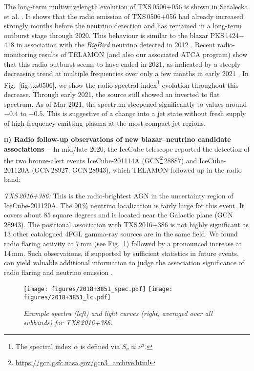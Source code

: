 \documentclass[a4paper,11pt]{article}
\begin{document}
The long-term multiwavelength evolution of TXS\,0506+056 is shown in Satalecka et al. \cite[][these proceedings]{satalecka2021}. It shows that the radio emission of TXS\,0506+056 had already increased strongly months before the neutrino detection and has remained in a long-term outburst stage through 2020. This behaviour is similar to the blazar PKS\,1424$-$418 in association with the \textsl{BigBird} neutrino detected in 2012 \cite{Kadler2016}.
Recent radio-monitoring results of TELAMON (and also our associated ATCA program) show that this radio outburst seems to have ended in 2021, as indicated by a steeply decreasing trend at multiple frequencies over only a few months in early 2021 \cite[see][for the radio and multiwavelength light curves]{satalecka2021}.
In Fig.~\ref{fig:txs0506}, we show the radio spectral-index\footnote{The spectral index $\alpha$ is defined via $S_\nu \propto \nu^\alpha$.} evolution throughout this decrease. Through early 2021, the source still showed an inverted to flat spectrum. As of Mar 2021, the spectrum steepened significantly to values around $-0.4$ to $-0.5$. This is suggestive of a change into a jet state without fresh supply of high-frequency emitting plasma at the most-compact jet regions.




\textbf{\textsc{ii)} Radio follow-up observations of new blazar--neutrino candidate associations --} In mid/late 2020, the IceCube telescope reported the detection of the two bronze-alert events IceCube-201114A (GCN{\footnote{\url{https://gcn.gsfc.nasa.gov/gcn3_archive.html}}}\,28887) and IceCube-201120A (GCN\,28927, GCN\,28943), which TELAMON followed up in the radio band:

\textsl{TXS\,2016+386:} This is the radio-brightest AGN in the uncertainty region of IceCube-201120A. The 90\,\% neutrino 
localization is fairly large for this event. It covers about $85$ square degrees and is located near the 
Galactic plane (GCN\,28943). The positional association with TXS\,2016+386 is not highly significant as 13 other catalogued 4FGL gamma-ray sources are in the same field. We found radio flaring activity at 7\,mm (see Fig.~\ref{fig:2018}) followed by a pronounced increase at 14\,mm. Such observations, if supported by sufficient statistics in future events, can yield valuable additional information to judge the association significance of radio flaring and neutrino emission \cite[cf.][]{Hovatta2021}.


\begin{figure}
    \centering
    \texttt{[image: figures/2018+3851\_spec.pdf]}
    \texttt{[image: figures/2018+3851\_lc.pdf]}
    \caption{\small \sl Example spectra (left) and light curves (right, averaged over all subbands) for TXS\,2016+386.}
    \label{fig:2018}
\end{figure}
\end{document}
